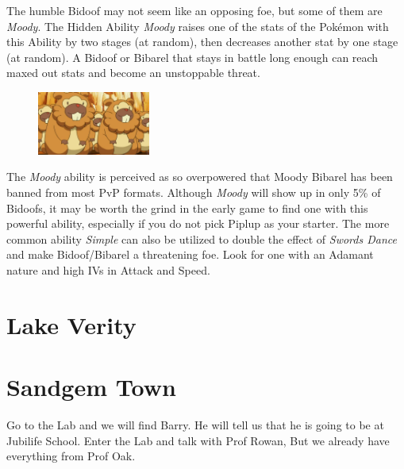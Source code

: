 \documentclass[11pt]{article}
\begin{document}
\begin{mdframed}[style=PokemonSpotlight,nobreak=true,frametitle={Pokemon Spotlight: Bidoof}]

The humble Bidoof may not seem like an opposing foe, but some of them are \emph{Moody}.
The Hidden Ability \emph{Moody} raises one of the stats of the Pokémon with this
Ability by two stages (at random), then decreases another stat by one stage (at random).
A Bidoof or Bibarel that stays in battle long enough can reach maxed out stats
and become an unstoppable threat.

\begin{figure}
\includegraphics[width=0.33\textwidth]{walkthrough/Sinnoh/spotlight-bidoof}
\label{fig:spotlight-bidoof}
\end{figure}

The \emph{Moody} ability is perceived as so overpowered that Moody Bibarel has been
banned from most PvP formats.
Although \emph{Moody} will show up in only 5\% of Bidoofs, it may be worth the
grind in the early game to find one with this powerful ability, especially if
you do not pick Piplup as your starter.
The more common ability \emph{Simple} can also be utilized to double the effect of
\emph{Swords Dance} and make Bidoof/Bibarel a threatening foe.
Look for one with an Adamant nature and high IVs in Attack and Speed.

\end{mdframed}

\section{Lake Verity}\label{sec:Lake_Verity}




\section{Sandgem Town}\label{sec:sandgem-town}
Go to the Lab and we will find Barry. He will tell us that he is going to be at Jubilife School.
Enter the Lab and talk with Prof Rowan, But we already have everything from Prof Oak.
\end{document}
